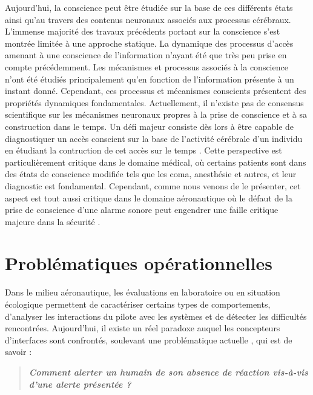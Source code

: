 Aujourd'hui, la conscience peut être étudiée sur la base de ces différents états ainsi qu'au travers des contenus neuronaux associés aux processus cérébraux. 
L'immense majorité des travaux précédents portant sur la conscience s'est montrée limitée à une approche statique. 
La dynamique des processus d'accès amenant à une conscience de l'information n'ayant été que très peu prise en compte précédemment. 
Les mécanismes et processus associés à la conscience n'ont été étudiés principalement qu'en fonction de l'information présente à un instant donné. 
Cependant, ces processus et mécanismes conscients présentent des propriétés dynamiques fondamentales. 
Actuellement, il n'existe pas de consensus scientifique sur les mécanismes neuronaux propres à la prise de conscience et à sa construction dans le temps. 
Un défi majeur consiste dès lors à être capable de diagnostiquer un accès conscient sur la base de l'activité cérébrale d'un individu en étudiant la contruction de cet accès sur le temps \citep{khamassi2021neurosciences}. 
Cette perspective est particulièrement critique dans le domaine médical, où certains patients sont dans des états de conscience modifiée tels que les coma, anesthésie et autres, et leur diagnostic est fondamental. 
Cependant, comme nous venons de le présenter, cet aspect est tout aussi critique dans le domaine aéronautique où le défaut de la prise de conscience d'une alarme sonore peut engendrer une faille critique majeure dans la sécurité \citep{bea1993accident, bliss2003investigation, dehais2010perseveration, dehais2014failure, dehais2017eeg, dehais2019inattentional, scannella2013effects, scannella2018auditory}. 

\section*{Problématiques opérationnelles }

Dans le milieu aéronautique, les évaluations en laboratoire ou en situation écologique permettent de caractériser certains types de comportements, d'analyser les interactions du pilote avec les systèmes et de détecter les difficultés rencontrées. 
Aujourd'hui, il existe un réel paradoxe auquel les concepteurs d'interfaces sont confrontés, soulevant une problématique actuelle \citep{dehais2010perseveration, dehais2014failure, dehais2017eeg, dehais2019inattentional, scannella2013effects, scannella2018auditory}, qui est de savoir : 
\begin{quote}
\textit{\textbf{Comment alerter un humain de son absence de réaction vis-à-vis d'une alerte présentée ?}}
\end{quote}

